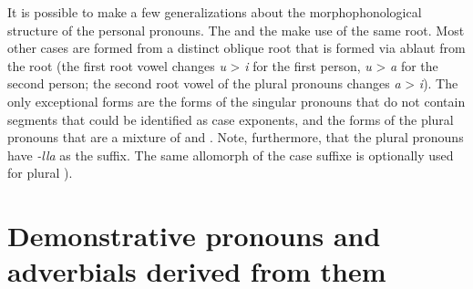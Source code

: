 It is possible to make a few generalizations about the morphophonological structure of the personal pronouns. The  and the  make use of the same root. Most other cases are formed from a distinct oblique root that is formed via ablaut from the  root (the first root vowel changes \textit{u} > \textit{i} for the first person, \textit{u} > \textit{a} for the second person; the second root vowel of the plural pronouns changes \textit{a} > \textit{i}). The only exceptional forms are the  forms of the singular pronouns that do not contain segments that could be identified as  case exponents, and the  forms of the plural pronouns that are a mixture of  and . Note, furthermore, that the plural pronouns have \textit{-lla} as the  suffix. The same allomorph of the  case suffixe is optionally used for plural  ).



\section{Demonstrative pronouns and adverbials derived from them}
\label{sec:Demonstrative pronouns}

